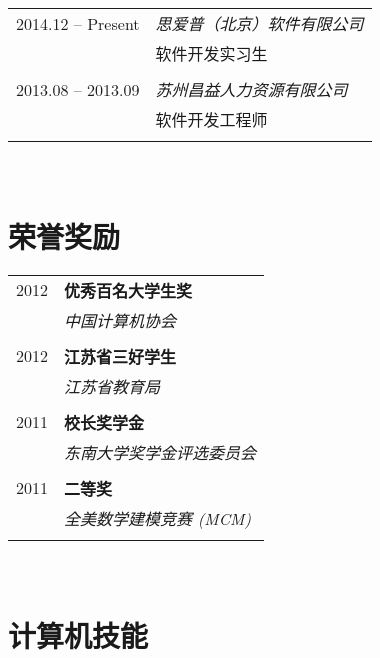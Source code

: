 \documentclass[10pt]{article} %
\begin{document}
{\begin{minipage}[t]{0.44\textwidth}
\begin{tabular}{rl}
2014.12 -- Present & \textit{思爱普（北京）软件有限公司} \\ 
& 软件开发实习生\\
& \\

2013.08 -- 2013.09 & \textit{苏州昌益人力资源有限公司} \\ 
& 软件开发工程师\\
& \\


\end{tabular}\\[10pt]



\section{荣誉奖励} 

\begin{tabular}{rl}
2012	 & \textbf{优秀百名大学生奖}\\
& \textit{中国计算机协会}\\ \\



2012	 & \textbf{江苏省三好学生}\\
& \textit{江苏省教育局}\\ \\

2011 & \textbf{校长奖学金}\\
& \textit{东南大学奖学金评选委员会} \\ \\

2011	 & \textbf{二等奖}\\
& \textit{全美数学建模竞赛 (MCM)}\\ \\

\end{tabular}\\[10pt]


\section{计算机技能} 


\end{minipage}}
\end{document}
